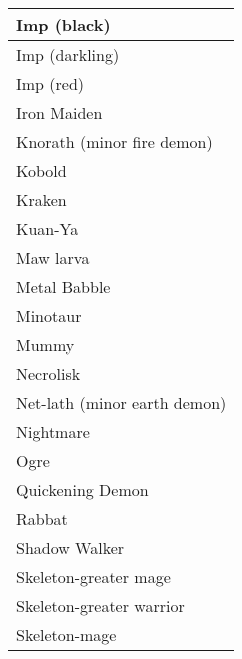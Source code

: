 \documentclass[twoside]{book}
\begin{document}
\begin{longtable}{p{1.25in}}
  \raggedright
           Imp (black) 
  \tabularnewline
  \hline
      
  \raggedright
           Imp (darkling) 
  \tabularnewline
  \hline
      
  \raggedright
           Imp (red) 
  \tabularnewline
  \hline
      
  \raggedright
           Iron Maiden 
  \tabularnewline
  \hline
      
  \raggedright
           Knorath (minor fire demon)
           
  \tabularnewline
  \hline
      
  \raggedright
           Kobold 
  \tabularnewline
  \hline
      
  \raggedright
           Kraken 
  \tabularnewline
  \hline
      
  \raggedright
           Kuan-Ya 
  \tabularnewline
  \hline
      
  \raggedright
           Maw larva 
  \tabularnewline
  \hline
      
  \raggedright
           Metal Babble 
  \tabularnewline
  \hline
      
  \raggedright
           Minotaur 
  \tabularnewline
  \hline
      
  \raggedright
           Mummy 
  \tabularnewline
  \hline
      
  \raggedright
           Necrolisk 
  \tabularnewline
  \hline
      
  \raggedright
           Net-lath (minor earth demon)
           
  \tabularnewline
  \hline
      
  \raggedright
           Nightmare 
  \tabularnewline
  \hline
      
  \raggedright
           Ogre 
  \tabularnewline
  \hline
      
  \raggedright
           Quickening Demon 
  \tabularnewline
  \hline
      
  \raggedright
           Rabbat 
  \tabularnewline
  \hline
      
  \raggedright
           Shadow Walker 
  \tabularnewline
  \hline
      
  \raggedright
           Skeleton-greater mage 
  \tabularnewline
  \hline
      
  \raggedright
           Skeleton-greater warrior
           
  \tabularnewline
  \hline
      
  \raggedright
           Skeleton-mage 
  \tabularnewline
  \hline
      

\end{longtable}
\end{document}
